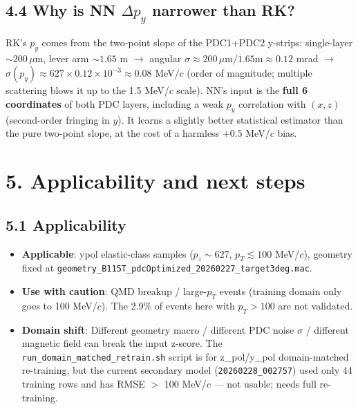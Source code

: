 \documentclass[a4paper,11pt]{article}
\begin{document}
\subsection{4.4 Why is NN $\Delta p_y$ narrower than RK?}
RK's $p_y$ comes from the two-point slope of the PDC1+PDC2 y-strips: single-layer $\sim 200\,\mu$m, lever arm $\sim 1.65$ m $\to$ angular $\sigma \approx 200\,\mu\text{m}/1.65\text{m} \approx 0.12$ mrad $\to$ $\sigma(p_y) \approx 627 \times 0.12 \times 10^{-3} \approx 0.08$ MeV/$c$ (order of magnitude; multiple scattering blows it up to the 1.5 MeV/$c$ scale).
NN's input is the \textbf{full 6 coordinates} of both PDC layers, including a weak $p_y$ correlation with $(x, z)$ (second-order fringing in $y$). It learns a slightly better statistical estimator than the pure two-point slope, at the cost of a harmless $+0.5$ MeV/$c$ bias.

\section{5. Applicability and next steps}

\subsection*{5.1 Applicability}
\begin{itemize}[nosep]
    \item \textbf{Applicable}: ypol elastic-class samples ($p_z\sim 627$, $p_T\lesssim 100$ MeV/$c$), geometry fixed at \texttt{geometry\_B115T\_pdcOptimized\_20260227\_target3deg.mac}.
    \item \textbf{Use with caution}: QMD breakup / large-$p_T$ events (training domain only goes to 100 MeV/$c$). The 2.9\% of events here with $p_T > 100$ are not validated.
    \item \textbf{Domain shift}: Different geometry macro / different PDC noise $\sigma$ / different magnetic field can break the input z-score. The \texttt{run\_domain\_matched\_retrain.sh} script is for z\_pol/y\_pol domain-matched re-training, but the current secondary model (\texttt{20260228\_002757}) used only 44 training rows and has RMSE $>$ 100 MeV/$c$ --- not usable; needs full re-training.
\end{itemize}
\end{document}
